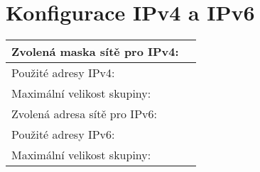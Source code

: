 \section{Konfigurace IPv4 a IPv6}

\begin{tabular}{|l|r|}
\hline
Zvolená maska sítě pro IPv4: & \hspace{15em} \\ \hline
Použité adresy IPv4: & \\ \hline
Maximální velikost skupiny: & \\ \hline \hline
Zvolená adresa sítě pro IPv6: & \\ \hline
Použité adresy IPv6: & \\ \hline
Maximální velikost skupiny: & \\ \hline
\end{tabular}
